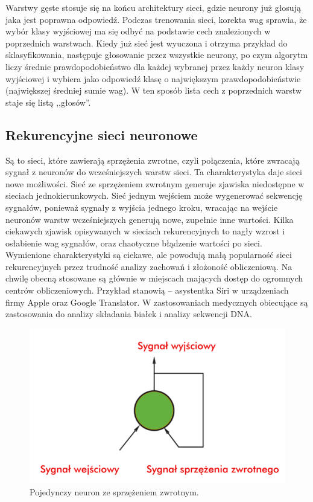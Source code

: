 \documentclass[12pt,a4paper,twoside,titlepage,openright]{book}
\begin{document}
Warstwy gęste stosuje się na końcu architektury sieci, gdzie neurony już głosują jaka jest poprawna odpowiedź. Podczas trenowania sieci, korekta wag sprawia, że wybór klasy wyjściowej ma się odbyć na podstawie cech znalezionych w poprzednich warstwach. Kiedy już sieć jest wyuczona i otrzyma przykład do sklasyfikowania, następuje głosowanie przez wszystkie neurony, po czym algorytm liczy średnie prawdopodobieństwo dla każdej wybranej przez każdy neuron klasy wyjściowej i wybiera jako odpowiedź klasę o największym prawdopodobieństwie (największej średniej sumie wag). W ten sposób lista cech z poprzednich warstw staje się listą ,,głosów''.

\subsection{Rekurencyjne sieci neuronowe}
Są to sieci, które zawierają sprzężenia zwrotne, czyli połączenia, które zwracają sygnał z neuronów do wcześniejszych warstw sieci. Ta charakterystyka daje sieci nowe możliwości. Sieć ze sprzężeniem zwrotnym generuje zjawiska niedostępne w sieciach jednokierunkowych. Sieć jednym wejściem może wygenerować sekwencję sygnałów, ponieważ sygnały z wyjścia jednego kroku, wracając na wejście neuronów warstw wcześniejszych generują nowe, zupełnie inne wartości. Kilka ciekawych zjawisk opisywanych w sieciach rekurencyjnych to nagły wzrost i osłabienie wag sygnałów, oraz chaotyczne błądzenie wartości po sieci. Wymienione charakterystyki są ciekawe, ale powodują małą popularność sieci rekurencyjnych przez trudność analizy zachowań i złożoność obliczeniową. Na chwilę obecną stosowane są głównie w miejscach mających dostęp do ogromnych centrów obliczeniowych. Przykład stanowią -- asystentka Siri w urządzeniach firmy Apple oraz Google Translator. W zastosowaniach medycznych obiecujące są zastosowania do analizy składania białek i analizy sekwencji DNA.

\begin{figure}[ht]
	\centering
			\includegraphics[resolution=100, scale=0.5]{recurrentNeuralNetwork.png}
		\caption{Pojedynczy neuron ze sprzężeniem zwrotnym.}
\end{figure}
\end{document}
